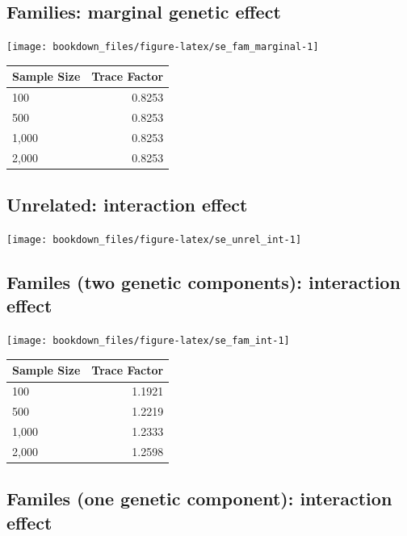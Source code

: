 \documentclass[]{book}
\theoremstyle{definition}
\theoremstyle{definition}
\theoremstyle{definition}
\theoremstyle{remark}
\begin{document}
\subsection{Families: marginal genetic
effect}\label{families-marginal-genetic-effect}

\begin{center}\texttt{[image: bookdown\_files/figure-latex/se\_fam\_marginal-1]} \end{center}

\begin{tabular}{l|r}
\hline
Sample Size & Trace Factor\\
\hline
100 & 0.8253\\
\hline
500 & 0.8253\\
\hline
1,000 & 0.8253\\
\hline
2,000 & 0.8253\\
\hline
\end{tabular}

\subsection{Unrelated: interaction
effect}\label{unrelated-interaction-effect}

\begin{center}\texttt{[image: bookdown\_files/figure-latex/se\_unrel\_int-1]} \end{center}

\subsection{Familes (two genetic components): interaction
effect}\label{familes-two-genetic-components-interaction-effect}

\begin{center}\texttt{[image: bookdown\_files/figure-latex/se\_fam\_int-1]} \end{center}

\begin{tabular}{l|r}
\hline
Sample Size & Trace Factor\\
\hline
100 & 1.1921\\
\hline
500 & 1.2219\\
\hline
1,000 & 1.2333\\
\hline
2,000 & 1.2598\\
\hline
\end{tabular}

\subsection{Familes (one genetic component): interaction
effect}\label{familes-one-genetic-component-interaction-effect}
\end{document}
